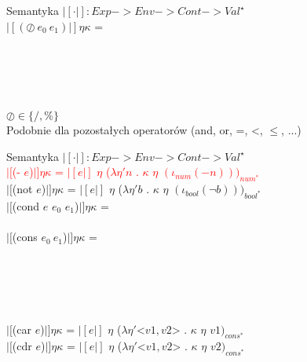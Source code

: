 \documentclass[12pt,serif]{beamer}
\begin{document}
\begin{frame}{Semantyka}
$|[ \cdot |]: Exp -> Env -> Cont -> Val^{\star}$ \newline
\\
$|[(\oslash~e_0~e_1)|] \eta \kappa$ = \\
\hspace{1em}{$|[e_0|]$ $\eta$ ($\lambda \eta_0 n_0$ .} \\
\hspace{2em}{$|[e_1|]$ $\eta$ ($\lambda \eta_1 n_1$ .} \\
 \\
 \\
 \newline
\\
$\oslash \in \{/,\%\}$ \newline
\\
\pause
Podobnie dla pozostałych operatorów (and, or, =, <, $\leq$, ...)
\end{frame}

\begin{frame}{Semantyka}
$|[ \cdot |]: Exp -> Env -> Cont -> Val^{\star}$ \newline
\\
\textcolor{red}{$|[$(- $e$)$|] \eta \kappa$ =
  $|[e|]$ $\eta$ ($\lambda \eta' n$ . $\kappa$ $\eta$ $(\iota_{num} (-n)))_{num^{*}}$} \\
$|[$(not $e$)$|] \eta \kappa$ =
  $|[e|]$ $\eta$ ($\lambda \eta' b$ . $\kappa$ $\eta$ $(\iota_{bool} (\neg b)))_{bool^{*}}$ \\
$|[$(cond $e$ $e_0$ $e_1$)$|] \eta \kappa$ = \\
 \newline
\\
$|[$(cons $e_0~e_1$)$|] \eta \kappa$ = \\
\hspace{1em}{$|[e_0|]$ $\eta$ ($\lambda \eta_0 v_0$ .} \\
\hspace{2em}{$|[e_1|]$ $\eta$ ($\lambda \eta_1 v_1$ .} \\
 \\
\hspace{2em}{)} \\
\hspace{1em}{)} \newline
\\
$|[$(car $e$)$|] \eta \kappa$ =
  $|[e|]$ $\eta$ ($\lambda \eta' $<$v1, v2$> . $\kappa$ $\eta$ $v1)_{cons^{*}}$ \\
$|[$(cdr $e$)$|] \eta \kappa$ =
  $|[e|]$ $\eta$ ($\lambda \eta' $<$v1, v2$> . $\kappa$ $\eta$ $v2)_{cons^{*}}$ \\
\end{frame}
\end{document}
